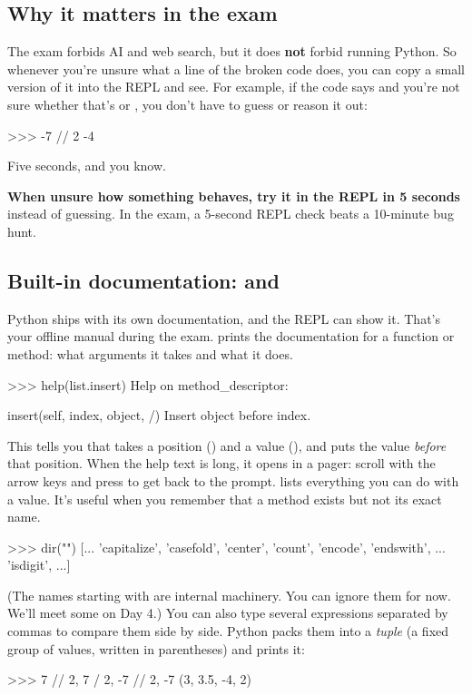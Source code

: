 \documentclass[10pt,a4paper]{article}
\begin{document}
\subsection{Why it matters in the exam}
The exam forbids AI and web search, but it does \textbf{not} forbid running Python. So whenever you’re unsure what a line of the broken code does, you can copy a small version of it into the REPL and see. For example, if the code says  and you’re not sure whether that’s  or , you don’t have to guess or reason it out:
\begin{txtcode}
>>> -7 // 2
-4
\end{txtcode}
Five seconds, and you know.
\begin{tipbox}
\textbf{When unsure how something behaves, try it in the REPL in 5 seconds} instead of guessing. In the exam, a 5-second REPL check beats a 10-minute bug hunt.
\end{tipbox}
\subsection{Built-in documentation:  and }
Python ships with its own documentation, and the REPL can show it. That’s your offline manual during the exam.
 prints the documentation for a function or method: what arguments it takes and what it does.
\begin{txtcode}
>>> help(list.insert)
Help on method_descriptor:

insert(self, index, object, /)
    Insert object before index.
\end{txtcode}
This tells you that  takes a position () and a value (), and puts the value \emph{before} that position. When the help text is long, it opens in a pager: scroll with the arrow keys and press  to get back to the prompt.
 lists everything you can do with a value. It’s useful when you remember that a method exists but not its exact name.
\begin{txtcode}
>>> dir("")
[... 'capitalize', 'casefold', 'center', 'count', 'encode', 'endswith', ... 'isdigit', ...]
\end{txtcode}
(The names starting with \code{\_\_} are internal machinery. You can ignore them for now. We’ll meet some on Day 4.)
You can also type several expressions separated by commas to compare them side by side. Python packs them into a \emph{tuple} (a fixed group of values, written in parentheses) and prints it:
\begin{txtcode}
>>> 7 // 2, 7 / 2, -7 // 2, -7 %
(3, 3.5, -4, 2)
\end{txtcode}
\setcounter{section}{1}
\end{document}
